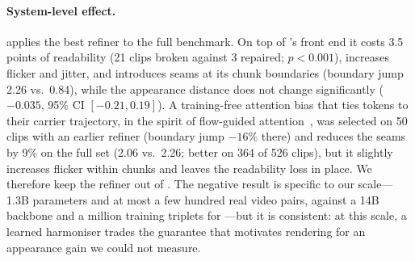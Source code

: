\paragraph{System-level effect.}  applies the best refiner to the full benchmark. On top of \method's front end it costs 3.5 points of readability (21 clips broken against 3 repaired; $p<0.001$), increases flicker and jitter, and introduces seams at its chunk boundaries (boundary jump 2.26 vs.\ 0.84), while the appearance distance does not change significantly ($-0.035$, 95\% CI $[-0.21, 0.19]$). A training-free attention bias that ties tokens to their carrier trajectory, in the spirit of flow-guided attention~\cite{cong2024flatten,geyer2024tokenflow}, was selected on 50 clips with an earlier refiner (boundary jump $-16\%$ there) and reduces the seams by 9\% on the full set (2.06 vs.\ 2.26; better on 364 of 526 clips), but it slightly increases flicker within chunks and leaves the readability loss in place. We therefore keep the refiner out of \method. The negative result is specific to our scale---1.3B parameters and at most a few hundred real video pairs, against a 14B backbone and a million training triplets for \steer---but it is consistent: at this scale, a learned harmoniser trades the guarantee that motivates rendering for an appearance gain we could not measure.
